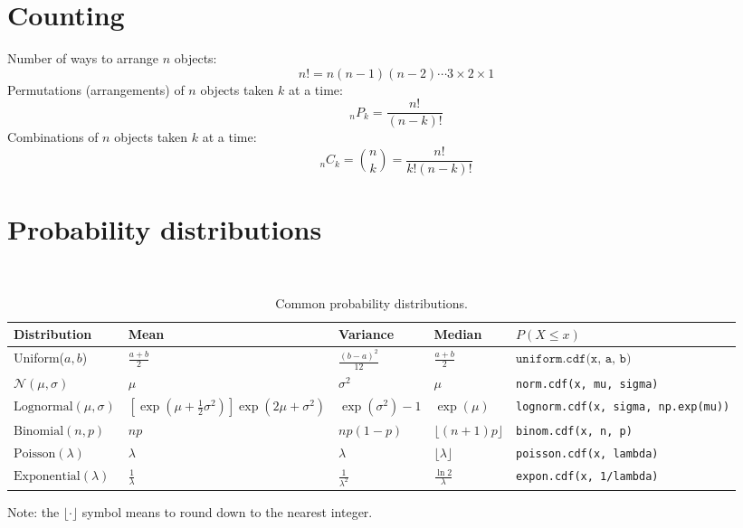 \documentclass[10pt,twoside]{article}
\newcommand{\lt}{\left}
\newcommand{\rt}{\right}
\newcommand{\?}{\stackrel{?}{=}}
\newcommand{\fr}{\frac}
\begin{document}
\section{Counting}
Number of ways to arrange $n$ objects:
\begin{equation}
  n! = n(n-1)(n-2)\cdots 3\times 2\times 1
\end{equation}
Permutations (arrangements) of $n$ objects taken $k$ at a time:
\begin{equation}
  _nP_k = \fr{n!}{(n-k)!}
\end{equation}
Combinations of $n$ objects taken $k$ at a time:
\begin{equation}
  _nC_k = {n \choose k} = \fr{n!}{k!(n-k)!}
\end{equation}    


\section{Probability distributions}
~
\begin{table}[ht!]\small
  \begin{tabular}{l l l l l} \toprule
    \bf Distribution & \bf Mean &\bf Variance & \bf Median & $P(X \leq x)$\\ \toprule
    Uniform($a,b$) & $\fr{a+b}2$ & $\fr{(b-a)^2}{12}$ & $\fr{a+b}2$ & $\texttt{uniform.cdf(x, a, b)}$ \\[2mm]
    $\mathcal{N}(\mu,\sigma)$ & $\mu$ & $\sigma^2$ & $\mu$ & \texttt{norm.cdf(x, mu, sigma)} \\[2mm]
    $\text{Lognormal}(\mu,\sigma)$ & $\lt[\exp\lt(\mu + \fr12 \sigma^2\rt)\rt]\exp(2\mu + \sigma^2)$ & $\exp\lt(\sigma^2\rt) - 1$ & $\exp\lt(\mu\rt)$ & \texttt{lognorm.cdf(x, sigma, np.exp(mu))} \\[2mm]
    $\text{Binomial}(n,p)$ & $np$ & $np(1-p)$ & $\lfloor (n+1)p \rfloor$ & \texttt{binom.cdf(x, n, p)} \\[2mm]
    $\text{Poisson}(\lambda)$ & $\lambda$ & $\lambda$ & $\lfloor \lambda \rfloor$ & \texttt{poisson.cdf(x, lambda)} \\[2mm]
    $\text{Exponential}(\lambda)$ & $\fr1{\lambda}$ & $\fr1{\lambda^2}$ & $\fr{\ln 2}{\lambda}$ & \texttt{expon.cdf(x, 1/lambda)} \\\bottomrule
  \end{tabular}
  \caption{Common probability distributions.}
  \label{tab:distributions}
\end{table}

Note: the $\lfloor \cdot \rfloor$ symbol means to round down to the nearest integer.
\end{document}
